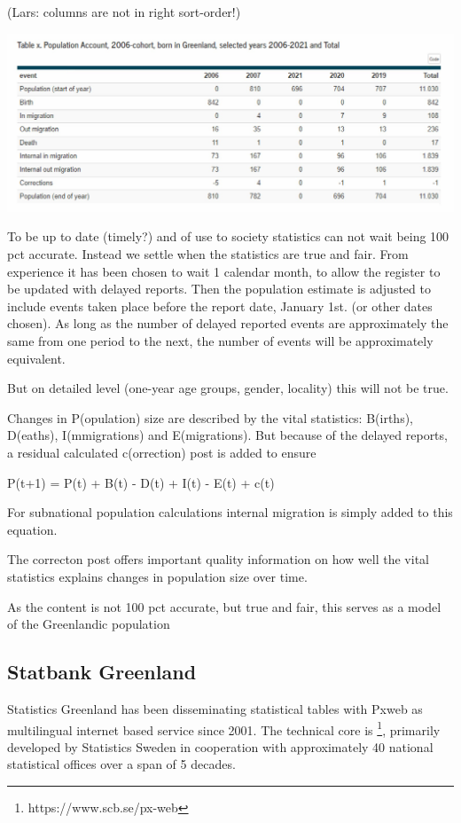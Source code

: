 \documentclass[USenglish]{article}
\begin{document}
(Lars: columns are not in right sort-order!)

\includegraphics[scale=0.22]{images/PopulationAccountTabX}


To be up to date (timely?) and of use to society statistics can not wait being 100 pct accurate. Instead we settle when the statistics are true and fair. From experience it has been chosen to wait 1 calendar month, to allow the register to be updated with delayed reports. Then the population estimate is adjusted to include events taken place before the report date, January 1st. (or other dates chosen). As long as the number of delayed reported events are approximately the same from one period to the next, the number of events will be approximately equivalent.

But on detailed level (one-year age groups, gender, locality) this will not be true.

Changes in P(opulation) size are described by the vital statistics: B(irths), D(eaths), I(mmigrations) and E(migrations). But because of the delayed reports, a residual calculated c(orrection) post is added to ensure


P(t+1) = P(t) + B(t) - D(t) + I(t) - E(t) + c(t)


For subnational population calculations internal migration is simply added to this equation.

The correcton post offers important quality information on how well the vital statistics explains changes in population size over time.

As the content is not 100 pct accurate, but true and fair, this serves as a model of the Greenlandic population


\subsection{Statbank Greenland} 
Statistics Greenland has been disseminating statistical tables with Pxweb as multilingual internet based service since 2001. The technical core is \footnote[the Pxweb-family]{https://www.scb.se/px-web}, primarily developed by Statistics Sweden in cooperation with approximately 40 national statistical offices over a span of 5 decades. 
\end{document}
